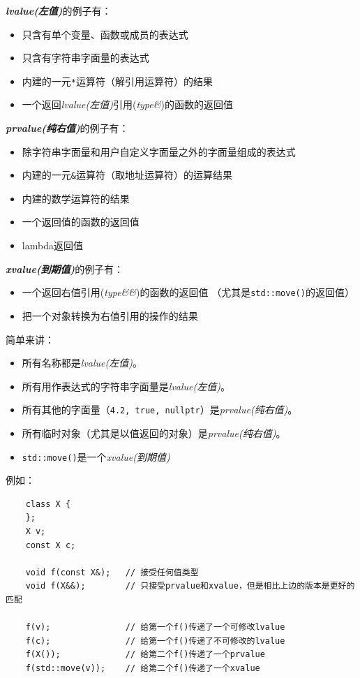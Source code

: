 \emph{\textbf{lvalue(左值)}}的例子有：
\begin{itemize}
    \item 只含有单个变量、函数或成员的表达式
    \item 只含有字符串字面量的表达式
    \item 内建的一元\texttt{*}运算符（解引用运算符）的结果
    \item 一个返回\emph{lvalue(左值)}引用(\emph{type\&})的函数的返回值
\end{itemize}
\emph{\textbf{prvalue(纯右值)}}的例子有：
\begin{itemize}
    \item 除字符串字面量和用户自定义字面量之外的字面量组成的表达式
    \item 内建的一元\texttt{\&}运算符（取地址运算符）的运算结果
    \item 内建的数学运算符的结果
    \item 一个返回值的函数的返回值
    \item lambda返回值
\end{itemize}
\emph{\textbf{xvalue(到期值)}}的例子有：
\begin{itemize}
    \item 一个返回右值引用(\emph{type\&\&})的函数的返回值
    （尤其是\texttt{std::move()}的返回值）
    \item 把一个对象转换为右值引用的操作的结果
\end{itemize}
简单来讲：
\begin{itemize}
    \item 所有名称都是\emph{lvalue(左值)}。
    \item 所有用作表达式的字符串字面量是\emph{lvalue(左值)}。
    \item 所有其他的字面量（\texttt{4.2, true, nullptr}）是\emph{prvalue(纯右值)}。
    \item 所有临时对象（尤其是以值返回的对象）是\emph{prvalue(纯右值)}。
    \item \texttt{std::move()}是一个\emph{xvalue(到期值)}
\end{itemize}
例如：
\begin{lstlisting}
    class X {
    };
    X v;
    const X c;

    void f(const X&);   // 接受任何值类型
    void f(X&&);        // 只接受prvalue和xvalue，但是相比上边的版本是更好的匹配

    f(v);               // 给第一个f()传递了一个可修改lvalue
    f(c);               // 给第一个f()传递了不可修改的lvalue
    f(X());             // 给第二个f()传递了一个prvalue
    f(std::move(v));    // 给第二个f()传递了一个xvalue
\end{lstlisting}
